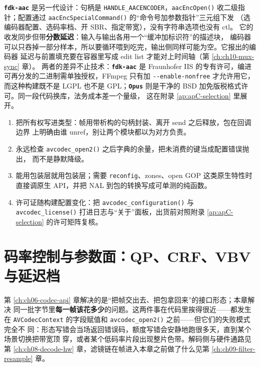 \documentclass[12pt,a4paper,fontset=fandol]{ctexbook}
\newcommand{\Fn}[1]{\texttt{#1()}}
\newcommand{\Tp}[1]{\texttt{#1}}
\newcommand{\Opt}[1]{\texttt{-\/-#1}}
\newcommand{\Lib}[1]{\textbf{\texttt{#1}}}
\begin{document}
\Lib{fdk-aac} 是另一代设计：句柄是 \Tp{HANDLE\_AACENCODER}，\Fn{aacEncOpen}
收二级指针；配置通过 \Fn{aacEncSpecialCommand} 的``命令号加参数指针''三元组下发
（选编码器配置、选码率档、开 SBR、指定带宽），没有字符串选项也没有 ctl。
它的收发同步但带\textbf{分数延迟}：输入与输出各用一个``缓冲加标识符''的描述块，
编码器可以只吞掉一部分样本，所以要循环喂到吃完，输出侧同样可能为空。它报出的编码器
延迟与前置填充要在容器里写成 edit list 才能对上时间轴（第 \ref{ch:ch10-mux-sync} 章）。
两者的差异不止技术：\Lib{fdk-aac} 是
Fraunhofer IIS 的专有许可，编进可再分发的二进制需单独授权，FFmpeg 只有加
\Opt{enable-nonfree} 才允许用它，而这种构建既不是 LGPL 也不是 GPL；\Lib{Opus}
则是干净的 BSD 加免版税格式许可。同一段代码换库，法务成本差一个量级，
这在附录 \ref{ap:apC-selection} 里展开。

\begin{bestpractice}[title={写编解码封装层的四条纪律}]
\begin{enumerate}
\item 把所有权写进类型：帧用带析构的句柄封装、离开 send 之后释放，包在回调边界
  上明确由谁 unref，别让两个模块都以为对方负责。
\item 永远检查 \Fn{avcodec\_open2} 之后字典的余量，把未消费的键当成配置错误抛出，
  而不是静默降级。
\item 能用包装层就用包装层；需要 \Tp{reconfig}、zones、open GOP 这类原生特性时
  直接调原生 API，并把 NAL 到包的转换写成可单测的纯函数。
\item 许可证随构建配置变化：把 \Fn{avcodec\_configuration} 与
  \Fn{avcodec\_license} 打进日志与``关于''面板，出货前对照附录
  \ref{ap:apC-selection} 的许可矩阵复核。
\end{enumerate}
\end{bestpractice}

\chapter{码率控制与参数面：QP、CRF、VBV 与延迟档}
\label{ch:ch07-rate-control}

第 \ref{ch:ch06-codec-api} 章解决的是``把帧交出去、把包拿回来''的接口形态；本章解决
同一批字节里\textbf{每一帧该花多少}的问题。这两件事在代码里挨得很近——都发生在
\Tp{AVCodecContext} 的字段赋值和 \Fn{avcodec\_open2} 之前——但它们的失败模式完全不
同：形态写错会当场返回错误码，额度写错会安静地跑很多天，直到某个场景切换把带宽顶
穿，或者某个低码率片段出现整片色带。解码侧与硬件通路见第
\ref{ch:ch08-decode-hw} 章，滤镜链在帧进入本章之前做了什么见第
\ref{ch:ch09-filter-resample} 章。
\end{document}
